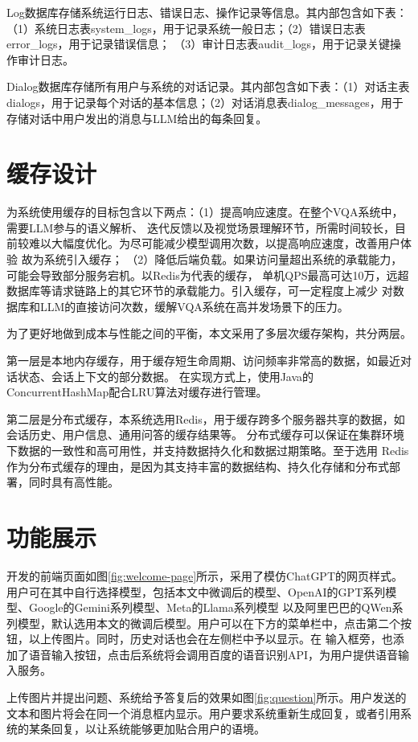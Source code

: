 Log数据库存储系统运行日志、错误日志、操作记录等信息。其内部包含如下表：（1）系统日志表system\_logs，用于记录系统一般日志；（2）错误日志表error\_logs，用于记录错误信息；
（3）审计日志表audit\_logs，用于记录关键操作审计日志。

Dialog数据库存储所有用户与系统的对话记录。其内部包含如下表：（1）对话主表dialogs，用于记录每个对话的基本信息；（2）对话消息表dialog\_messages，用于
存储对话中用户发出的消息与LLM给出的每条回复。

\section{缓存设计}
为系统使用缓存的目标包含以下两点：（1）提高响应速度。在整个VQA系统中，需要LLM参与的语义解析、
迭代反馈以及视觉场景理解环节，所需时间较长，目前较难以大幅度优化。为尽可能减少模型调用次数，以提高响应速度，改善用户体验
故为系统引入缓存；
（2）降低后端负载。如果访问量超出系统的承载能力，可能会导致部分服务宕机。以Redis为代表的缓存，
单机QPS最高可达10万，远超数据库等请求链路上的其它环节的承载能力。引入缓存，可一定程度上减少
对数据库和LLM的直接访问次数，缓解VQA系统在高并发场景下的压力。

为了更好地做到成本与性能之间的平衡，本文采用了多层次缓存架构，共分两层。

第一层是本地内存缓存，用于缓存短生命周期、访问频率非常高的数据，如最近对话状态、会话上下文的部分数据。
在实现方式上，使用Java的ConcurrentHashMap配合LRU算法对缓存进行管理。

第二层是分布式缓存，本系统选用Redis，用于缓存跨多个服务器共享的数据，如会话历史、用户信息、通用问答的缓存结果等。
分布式缓存可以保证在集群环境下数据的一致性和高可用性，并支持数据持久化和数据过期策略。至于选用
Redis作为分布式缓存的理由，是因为其支持丰富的数据结构、持久化存储和分布式部署，同时具有高性能。

\section{功能展示}
开发的前端页面如图\ref{fig:welcome-page}所示，采用了模仿ChatGPT的网页样式。
用户可在其中自行选择模型，包括本文中微调后的模型、OpenAI的GPT系列模型、Google的Gemini系列模型、Meta的Llama系列模型
以及阿里巴巴的QWen系列模型，默认选用本文的微调后模型。用户可以在下方的菜单栏中，点击第二个按钮，以上传图片。同时，历史对话也会在左侧栏中予以显示。在
输入框旁，也添加了语音输入按钮，点击后系统将会调用百度的语音识别API，为用户提供语音输入服务。

上传图片并提出问题、系统给予答复后的效果如图\ref{fig:question}所示。用户发送的文本和图片将会在同一个消息框内显示。用户要求系统重新生成回复，或者引用系统的某条回复，以让系统能够更加贴合用户的语境。

